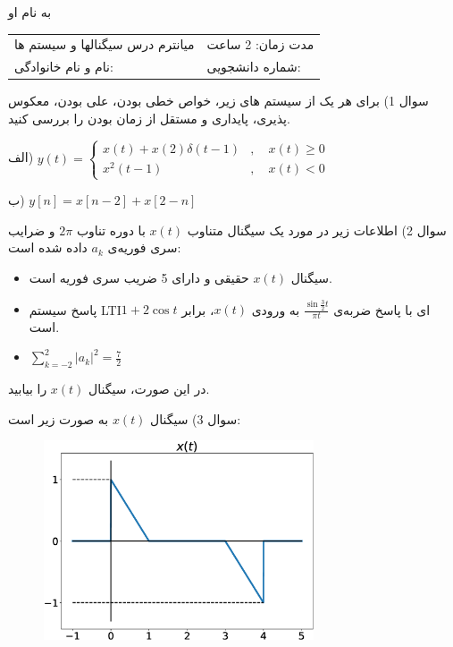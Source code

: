 \documentclass{article}
\begin{document}
{
\Huge


\begin{center}
به نام او

\begin{table}[h]
\centering
\Large
\begin{tabular}{p{90mm}p{50mm}}
میانترم درس سیگنالها و سیستم ها
&
مدت زمان: 2 ساعت
\\
نام و نام خانوادگی: 
&
شماره دانشجویی:
\end{tabular}
\end{table}
\end{center}
}
\hrulefill

\Large

سوال 1) برای هر یک از سیستم های زیر، خواص خطی بودن، علی بودن، معکوس پذیری، پایداری و مستقل از زمان بودن را بررسی کنید.

الف)
$
y(t)=\begin{cases}
x(t)+x(2)\delta(t-1)&,\quad x(t)\ge 0\\
x^2(t-1)&,\quad x(t)< 0
\end{cases}
$

ب) 
$
y[n]=x[n-2]+x[2-n]
$


\newpage

سوال 2) اطلاعات زیر در مورد یک سیگنال متناوب
$
x(t)
$
با دوره تناوب
$
2\pi
$
و ضرایب سری فوریه‌ی 
$
a_k
$
داده شده است:
\begin{itemize}
\item
سیگنال 
$
x(t)
$
حقیقی و دارای 5 ضریب سری فوریه است.
\item
پاسخ سیستم 
LTIای
با پاسخ ضربه‌ی 
$
\frac{\sin \frac{3}{2}t}{\pi t}
$
به ورودی 
$
x(t)
$،
برابر
$
1+2\cos t
$
است.
\item
$
\sum_{k=-2}^{2}|a_k|^2=\frac{7}{2}
$
\end{itemize}
در این صورت، سیگنال 
$
x(t)
$
را بیابید.

\newpage

سوال 3) سیگنال 
$
x(t)
$
به صورت زیر است:
\begin{figure}[h]
\centering
\includegraphics[width=80mm]{midterm_q3.eps}
\end{figure}
\end{document}
